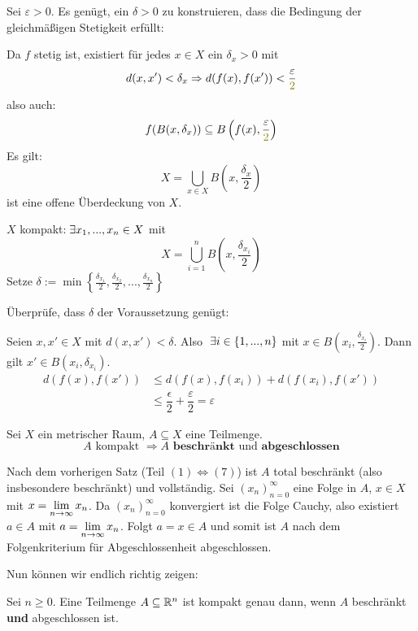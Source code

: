\documentclass[main.tex]{subfiles}
\begin{document}
\begin{Beweis}
  Sei $\varepsilon > 0$. Es genügt, ein $\delta > 0$ zu konstruieren, dass die Bedingung der gleichmäßigen Stetigkeit erfüllt:

  Da $f$ stetig ist, existiert für jedes $x \in X$ ein $\delta_x > 0$ mit
  $$d(x,x') < \delta_x \Rightarrow d(f(x),f(x')) < \dfrac{\varepsilon}{\color{olive} 2}$$
  also auch:
  $$f(B(x,\delta_x)) \subseteq B\left(f(x),\frac{\varepsilon}{\color{olive} 2}\right)$$
  Es gilt:
  $$X = \bigcup_{x \in X} B\left(x,\frac{\delta_x}{2}\right)$$
  ist eine offene Überdeckung von $X$.

  $X$ kompakt:$\;\exists x_1, ..., x_n \in X$ mit
  $$X = \bigcup_{i = 1}^n B\left(x,\frac{\delta_{x_i}}{2}\right)$$
  Setze $\delta := \min \left\{ \frac{\delta_{x_1}}{2},\frac{\delta_{x_2}}{2},...,\frac{\delta_{x_n}}{2} \right\}$

  Überprüfe, dass $\delta$ der Voraussetzung genügt:

  Seien $x,x' \in X$ mit $d(x,x') < \delta$. Also $\;\exists i \in \{1,...,n\}$ mit $x \in B(x_i,\frac{\delta_{x_i}}{2})$. Dann gilt $x' \in B(x_i,\delta_{x_i})$.
  $$\begin{aligned}
    d(f(x),f(x')) & \leq d(f(x),f(x_i)) + d(f(x_i),f(x')) \\
    & \leq \dfrac{\epsilon}{2} + \dfrac{\varepsilon}{2} = \varepsilon
  \end{aligned}$$
\end{Beweis}

\begin{Theorem}
  Sei $X$ ein metrischer Raum, $A \subseteq X$ eine Teilmenge.
  $$A \text{ kompakt } \Rightarrow A \textbf{ beschränkt } \text{und} \textbf{ abgeschlossen}$$
\end{Theorem}

\begin{Beweis}
  Nach dem vorherigen Satz (Teil $(1) \Leftrightarrow (7)$) ist $A$ total beschränkt (also insbesondere beschränkt) und vollständig. Sei $(x_n)_{n = 0}^\infty$ eine Folge in $A$, $x \in X$ mit $x = \lim \limits_{n \to \infty} x_n$. Da $(x_n)_{n = 0}^\infty$ konvergiert ist die Folge Cauchy, also existiert $a \in A$ mit $a = \lim \limits_{n \to \infty} x_n$. Folgt $a = x \in A$ und somit ist $A$ nach dem Folgenkriterium für Abgeschlossenheit abgeschlossen.
\end{Beweis}

Nun können wir endlich richtig zeigen:
\begin{Theorem}
  Sei $n \geq 0$. Eine Teilmenge $A \subseteq \mathbb{R}^n$ ist kompakt genau dann, wenn $A$ beschränkt \textbf{und} abgeschlossen ist.
\end{Theorem}
\end{document}
